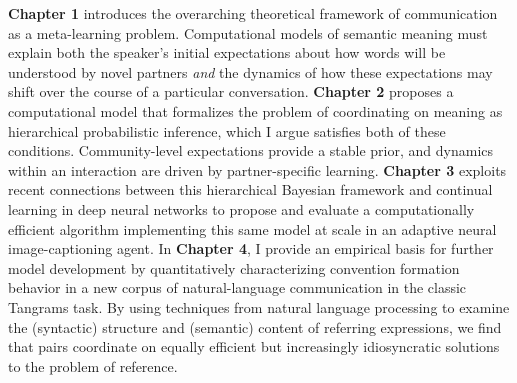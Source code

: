 \textbf{Chapter 1} introduces the overarching theoretical framework of communication as a meta-learning problem. 
Computational models of semantic meaning must explain both the speaker's initial expectations about how words will be understood by novel partners \emph{and} the dynamics of how these expectations may shift over the course of a particular conversation. %
\textbf{Chapter 2} proposes a computational model that formalizes the problem of coordinating on meaning as hierarchical probabilistic inference, which I argue satisfies both of these conditions.
Community-level expectations provide a stable prior, and dynamics within an interaction are driven by partner-specific learning.
\textbf{Chapter 3} exploits recent connections between this hierarchical Bayesian framework and continual learning in deep neural networks to propose and evaluate a computationally efficient algorithm implementing this same model at scale in an adaptive neural image-captioning agent.
In \textbf{Chapter 4}, I provide an empirical basis for further model development by quantitatively characterizing convention formation behavior in a new corpus of natural-language communication in the classic Tangrams task. %
By using techniques from natural language processing to examine the (syntactic) structure and (semantic) content of referring expressions, we find that pairs coordinate on equally efficient but increasingly idiosyncratic solutions to the problem of reference. %
